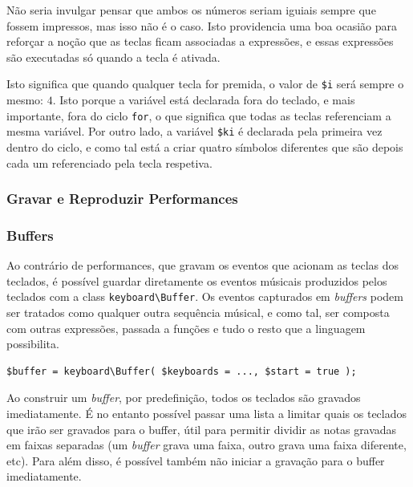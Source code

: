 Não seria invulgar pensar que ambos os números seriam iguiais sempre que fossem impressos, mas isso não é o caso. Isto providencia uma boa ocasião para reforçar a noção que as teclas ficam associadas a expressões, e essas expressões são executadas só quando a tecla é ativada.

Isto significa que quando qualquer tecla for premida, o valor de \texttt{\$i} será sempre o mesmo: $4$. Isto porque a variável está declarada fora do teclado, e mais importante, fora do ciclo \texttt{for}, o que significa que todas as teclas referenciam a mesma variável. Por outro lado, a variável \texttt{\$ki} é declarada pela primeira vez dentro do ciclo, e como tal está a criar quatro símbolos diferentes que são depois cada um referenciado pela tecla respetiva.

\subsubsection{Gravar e Reproduzir Performances}

\subsubsection{Buffers}
Ao contrário de performances, que gravam os eventos que acionam as teclas dos teclados, é possível guardar diretamente os eventos músicais produzidos pelos teclados com a class \texttt{keyboard\textbackslash{}Buffer}. Os eventos capturados em \textit{buffers} podem ser tratados como qualquer outra sequência músical, e como tal, ser composta com outras expressões, passada a funções e tudo o resto que a linguagem possibilita. 

\begin{lstlisting}[caption={Instanciação de um \textit{buffer}}]
$buffer = keyboard\Buffer( $keyboards = ..., $start = true );
\end{lstlisting}
Ao construir um \textit{buffer}, por predefinição, todos os teclados são gravados imediatamente. É no entanto possível passar uma lista a limitar quais os teclados que irão ser gravados para o buffer, útil para permitir dividir as notas gravadas em faixas separadas (um \textit{buffer} grava uma faixa, outro grava uma faixa diferente, etc). Para além disso, é possível também não iniciar a gravação para o buffer imediatamente. 

